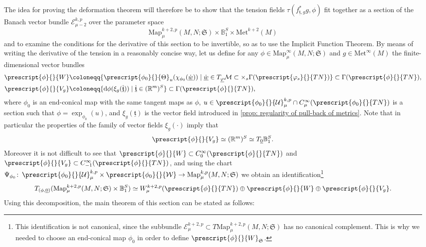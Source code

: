 \documentclass{article}
\numberwithin{equation}{section}        %
\theoremstyle{bfnote}
\theoremstyle{definition}
\theoremstyle{bfremark}
\newcommand{\col}{\colon \thinspace}        %
\newcommand{\R}{\mathbb{R}}                 %
\newcommand{\Ball}{\mathbb{B}}              %
\newcommand{\Map}{\mathrm{Map}}             %
\newcommand{\Met}{\mathrm{Met}}             %
\newcommand{\diff}{\mathrm{d}}                      %
\begin{document}
The idea for proving the deformation theorem will therefore be to show that the tension fields $\tau(f_{\underline{\mathfrak{t}},g}^*g,\phi)$ fit together as a section of the Banach vector bundle $\mathcal{E}^{k,p}_{\mu-2}$ over the parameter space 
\begin{equation*}
    \Map^{k+2,p}_\mu(M,N;\mathfrak{S}) \times \Ball_1^S \times \Met^{k+2}(M) 
\end{equation*}
and to examine the conditions for the derivative of this section to be invertible, so as to use the Implicit Function Theorem. By means of writing the derivative of the tension in a reasonably concise way, let us define for any $\phi \in \Map^\infty_\mu(M,N;\mathfrak{S})$ and $g \in \Met^\infty(M)$ the finite-dimensional vector bundles
\begin{align}
    \prescript{\phi}{}{W} & \coloneqq \{ \prescript{\phi_0}{}{\Theta}_u(\chi_{\phi_0}(\dot{\underline{w}})) \mid \dot{\underline{w}} \in T_{\underline{\varphi}} \mathcal{M} \subset \times_s \Gamma(\prescript{\varphi_s}{}{TN})\} \subset \Gamma(\prescript{\phi}{}{TN}), \\
    \prescript{\phi}{}{V_g} & \coloneqq \{ \diff \phi(\xi_g(\dot{\underline{\mathfrak{t}}})) \mid \dot{\underline{\mathfrak{t}}} \in (\R^m)^S\} \subset \Gamma(\prescript{\phi}{}{TN}),
\end{align}
where $\phi_0$ is an end-conical map with the same tangent maps as $\phi$, $u \in \prescript{\phi_0}{}{\mathcal{U}}^{k,p}_\mu \cap C^\infty_\mu(\prescript{\phi_0}{}{TN})$ is a section such that $\phi = \exp_{\phi_0}(u)$, and $\xi_g(\underline{\mathfrak{t}})$ is the vector field introduced in \cref{prop: regularity of pull-back of metrics}. Note that in particular the properties of the family of vector fields $\xi_g(\cdot)$ imply that
\begin{equation*}
    \prescript{\phi}{}{V_g} \simeq (\R^m)^S \simeq T_{\underline{0}} \Ball_1^S. 
\end{equation*}
Moreover it is not difficult to see that $\prescript{\phi}{}{W} \subset C^{\infty}_0(\prescript{\phi}{}{TN})$ and $\prescript{\phi}{}{V_g} \subset C^\infty_{-1}(\prescript{\phi}{}{TN})$, and using the chart $\Psi_{\phi_0} \col \prescript{\phi_0}{}{\mathcal{U}}^{k,p}_\mu \times \prescript{\phi_0}{}{\mathcal{W}} \to \Map^{k,p}_\mu(M,N;\mathfrak{S})$ we obtain an identification\footnote{This identification is not canonical, since the subbundle $\mathcal{E}^{k+2,p}_\mu \subset T \Map^{k+2,p}_\mu(M,N;\mathfrak{S})$ has no canonical complement. This is why we needed to choose an end-conical map $\phi_0$ in order to define $\prescript{\phi}{}{W}_{\mathfrak{S}}$.}
\begin{equation}        \label{eq: tangent bundle of Map times B}
    T_{(\phi,\underline{0})}(\Map^{k+2,p}_\mu(M,N;\mathfrak{S}) \times \Ball_1^S) \simeq W^{k+2,p}_\mu(\prescript{\phi}{}{TN}) \oplus \prescript{\phi}{}{W} \oplus \prescript{\phi}{}{V_g} .
\end{equation}
Using this decomposition, the main theorem of this section can be stated as follows:
\end{document}
